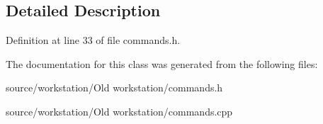 \subsection{Detailed Description}


Definition at line 33 of file commands.\-h.



The documentation for this class was generated from the following files\-:\begin{DoxyCompactItemize}
\item 
source/workstation/\-Old workstation/commands.\-h\item 
source/workstation/\-Old workstation/commands.\-cpp\end{DoxyCompactItemize}
